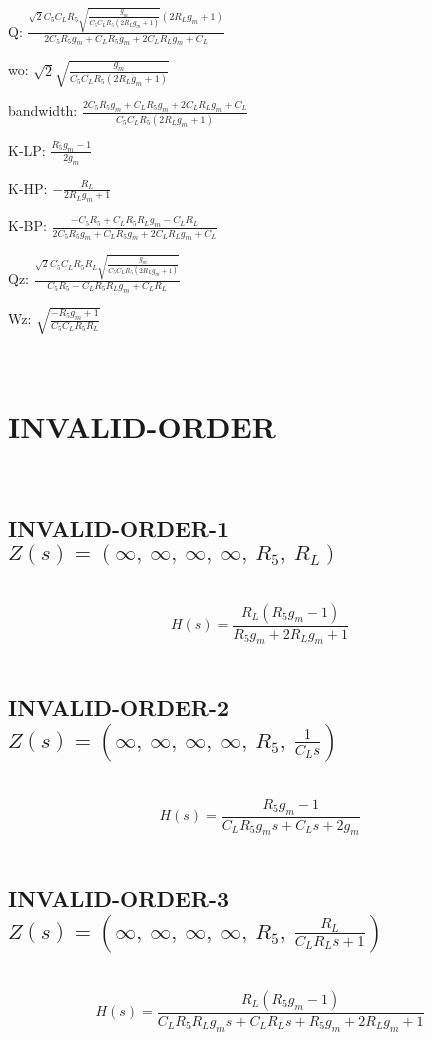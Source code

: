 \documentclass{article}
\begin{document}
Q: $\frac{\sqrt{2} C_{5} C_{L} R_{5} \sqrt{\frac{g_{m}}{C_{5} C_{L} R_{5} \left(2 R_{L} g_{m} + 1\right)}} \left(2 R_{L} g_{m} + 1\right)}{2 C_{5} R_{5} g_{m} + C_{L} R_{5} g_{m} + 2 C_{L} R_{L} g_{m} + C_{L}}$\ 

wo: $\sqrt{2} \sqrt{\frac{g_{m}}{C_{5} C_{L} R_{5} \left(2 R_{L} g_{m} + 1\right)}}$\ 

bandwidth: $\frac{2 C_{5} R_{5} g_{m} + C_{L} R_{5} g_{m} + 2 C_{L} R_{L} g_{m} + C_{L}}{C_{5} C_{L} R_{5} \left(2 R_{L} g_{m} + 1\right)}$\ 

K-LP: $\frac{R_{5} g_{m} - 1}{2 g_{m}}$\ 

K-HP: $- \frac{R_{L}}{2 R_{L} g_{m} + 1}$\ 

K-BP: $\frac{- C_{5} R_{5} + C_{L} R_{5} R_{L} g_{m} - C_{L} R_{L}}{2 C_{5} R_{5} g_{m} + C_{L} R_{5} g_{m} + 2 C_{L} R_{L} g_{m} + C_{L}}$\ 

Qz: $\frac{\sqrt{2} C_{5} C_{L} R_{5} R_{L} \sqrt{\frac{g_{m}}{C_{5} C_{L} R_{5} \left(2 R_{L} g_{m} + 1\right)}}}{C_{5} R_{5} - C_{L} R_{5} R_{L} g_{m} + C_{L} R_{L}}$\ 

Wz: $\sqrt{\frac{- R_{5} g_{m} + 1}{C_{5} C_{L} R_{5} R_{L}}}$\ 

\ 

\section{INVALID-ORDER}\ 
\subsection{INVALID-ORDER-1 $Z(s) = \left( \infty, \  \infty, \  \infty, \  \infty, \  R_{5}, \  R_{L}\right)$ } \ 
\textbf{\[H(s) = \frac{R_{L} \left(R_{5} g_{m} - 1\right)}{R_{5} g_{m} + 2 R_{L} g_{m} + 1}\] } \ 
\subsection{INVALID-ORDER-2 $Z(s) = \left( \infty, \  \infty, \  \infty, \  \infty, \  R_{5}, \  \frac{1}{C_{L} s}\right)$ } \ 
\textbf{\[H(s) = \frac{R_{5} g_{m} - 1}{C_{L} R_{5} g_{m} s + C_{L} s + 2 g_{m}}\] } \ 
\subsection{INVALID-ORDER-3 $Z(s) = \left( \infty, \  \infty, \  \infty, \  \infty, \  R_{5}, \  \frac{R_{L}}{C_{L} R_{L} s + 1}\right)$ } \ 
\textbf{\[H(s) = \frac{R_{L} \left(R_{5} g_{m} - 1\right)}{C_{L} R_{5} R_{L} g_{m} s + C_{L} R_{L} s + R_{5} g_{m} + 2 R_{L} g_{m} + 1}\] } \ 
\end{document}

